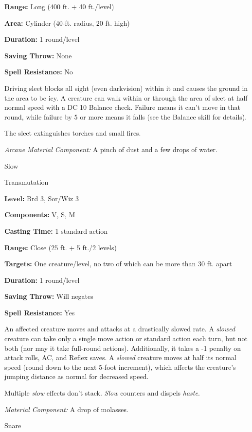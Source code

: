 \documentclass{article}
\begin{document}
\textbf{Range:} Long (400 ft. + 40 ft./level)

\textbf{Area:} Cylinder (40-ft. radius, 20 ft. high)

\textbf{Duration:} 1 round/level

\textbf{Saving Throw:} None

\textbf{Spell Resistance:} No

Driving sleet blocks all sight (even darkvision) within it and causes the ground 
in the area to be icy. A creature can walk within or through the area of sleet 
at half normal speed with a DC 10 Balance check. Failure means it can't move in 
that round, while failure by 5 or more means it falls (see the Balance skill for 
details).

The sleet extinguishes torches and small fires.

\textit{Arcane Material Component: }A pinch of dust and a few drops of water.

\vspace{12pt}
Slow

Transmutation

\textbf{Level:} Brd 3, Sor/Wiz 3

\textbf{Components:} V, S, M

\textbf{Casting Time:} 1 standard action

\textbf{Range:} Close (25 ft. + 5 ft./2 levels)

\textbf{Targets:} One creature/level, no two of which can be more than 30 ft. apart

\textbf{Duration:} 1 round/level

\textbf{Saving Throw: }Will negates

\textbf{Spell Resistance:} Yes

An affected creature moves and attacks at a drastically slowed rate. A \textit{slowed 
}creature can take only a single move action or standard action each turn, but 
not both (nor may it take full-round actions). Additionally, it takes a -1 penalty 
on attack rolls, AC, and Reflex saves. A \textit{slowed }creature moves at half 
its normal speed (round down to the next 5-foot increment), which affects the creature's 
jumping distance as normal for decreased speed.

Multiple \textit{slow }effects don't stack. \textit{Slow }counters and dispels 
\textit{haste}.

\textit{Material Component: }A drop of molasses.

\vspace{12pt}
Snare
\end{document}
